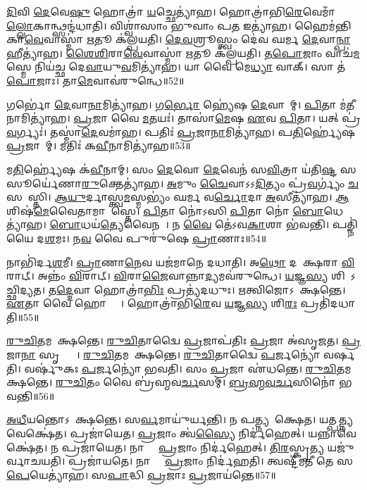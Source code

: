 \ul{𑌦𑌿}𑌵𑌿 \ul{𑌦𑍇}𑌵𑍇\ul{𑌷𑍁} 𑌹𑍋𑌤𑍍𑌰𑌾॑ \ul{𑌯}𑌚𑍍𑌛𑍇𑌤𑍍𑌯𑌾॑𑌹। 
𑌹𑍋𑌤𑍍𑌰𑌾॑𑌭𑌿\ul{𑌰𑍇}𑌵𑍇𑌮𑌾𑌁\ul{𑌲𑍍𑌲𑍋}𑌕𑌾𑌨𑍍𑌥𑍍𑌸𑌨𑍍𑌦॑\-𑌧𑌾𑌤𑌿। 
𑌵𑌿𑌶𑍍𑌵𑌾॑𑌸𑌾𑌂 𑌭𑍁𑌵𑌾𑌂 𑌪\ul{𑌤} 𑌇𑌤𑍍𑌯𑌾॑𑌹। 
𑌹𑍈𑌮॑𑌨𑍍𑌤𑌿𑌕𑌾\ul{𑌵𑍇}𑌵𑌾𑌸𑍍𑌮𑌾॑ \ul{𑌋}𑌤𑍂 𑌕॑𑌲𑍍𑌪𑌯𑌤𑌿। 
\ul{𑌦𑍇}\ul{𑌵}𑌶𑍍𑌰𑍂𑌸𑍍𑌤𑍍𑌵𑌂 𑌦𑍇॑𑌵 𑌘𑌰𑍍𑌮 \ul{𑌦𑍇}𑌵𑌾\ul{𑌨𑍍𑌪𑌾}𑌹𑍀𑌤𑍍𑌯𑌾॑𑌹। 
\ul{𑌶𑍈}\ul{𑌶𑌿}𑌰𑌾\ul{𑌵𑍇}𑌵𑌾𑌸𑍍𑌮𑌾॑ \ul{𑌋}𑌤𑍂 𑌕॑𑌲𑍍𑌪𑌯𑌤𑌿। 
\ul{𑌤}\ul{𑌪𑍋}𑌜𑌾𑌂 𑌵𑌾𑌚॑\ul{𑌮}𑌸𑍍𑌮𑍇 𑌨𑌿𑌯॑𑌚𑍍𑌛 𑌦𑍇\ul{𑌵𑌾}𑌯𑍁\ul{𑌵}𑌮𑌿𑌤𑍍𑌯𑌾॑𑌹। 
𑌯𑌾 𑌵𑍈 𑌮𑍇\ul{𑌧𑍍𑌯𑌾} 𑌵𑌾𑌕𑍍। 
𑌸𑌾 𑌤॑\ul{𑌪𑍋}𑌜𑌾𑌃। 
𑌤𑌾\ul{𑌮𑍇}𑌵𑌾𑌵॑𑌰𑍁𑌨𑍍𑌧𑍇॥52॥

𑌗𑌰𑍍𑌭𑍋॑ \ul{𑌦𑍇}𑌵𑌾\ul{𑌨𑌾}𑌮𑌿𑌤𑍍𑌯𑌾॑𑌹। 
𑌗\ul{𑌰𑍍𑌭𑍋} 𑌹𑍍𑌯𑍇॑𑌷 \ul{𑌦𑍇}𑌵𑌾𑌨𑌾᳚𑌮𑍍। 
\ul{𑌪𑌿}𑌤𑌾 𑌮॑\ul{𑌤𑍀}𑌨𑌾𑌮𑌿𑌤𑍍𑌯𑌾॑𑌹। 
\ul{𑌪𑍍𑌰}𑌜𑌾 𑌵𑍈 \ul{𑌮}𑌤𑌯𑌃॑। 
𑌤𑌾𑌸𑌾॑\ul{𑌮𑍇}𑌷 \ul{𑌏}𑌵 \ul{𑌪𑌿}𑌤𑌾। 
𑌯𑌤𑍍 𑌪𑍍𑌰॑\ul{𑌵}𑌰𑍍𑌗𑍍𑌯𑌃॑। 
𑌤𑌸𑍍𑌮𑌾॑\ul{𑌦𑍇}𑌵𑌮𑌾॑𑌹। 
𑌪𑌤𑌿𑌃॑ \ul{𑌪𑍍𑌰}𑌜𑌾\ul{𑌨𑌾}𑌮𑌿𑌤𑍍𑌯𑌾॑𑌹। 
𑌪\ul{𑌤𑌿}𑌰𑍍𑌹𑍍𑌯𑍇॑𑌷 \ul{𑌪𑍍𑌰}𑌜𑌾𑌨𑌾᳚𑌮𑍍। 
𑌮𑌤𑌿𑌃॑ 𑌕\ul{𑌵𑍀}𑌨𑌾𑌮𑌿𑌤𑍍𑌯𑌾॑𑌹॥53॥

𑌮\ul{𑌤𑌿}𑌰𑍍𑌹𑍍𑌯𑍇॑𑌷 𑌕॑\ul{𑌵𑍀}𑌨𑌾𑌮𑍍। 
𑌸𑌂 \ul{𑌦𑍇}𑌵𑍋 \ul{𑌦𑍇}𑌵𑍇𑌨॑ 𑌸\ul{𑌵𑌿}𑌤𑍍𑌰𑌾 𑌯॑𑌤𑌿\ul{𑌷𑍍𑌟} 𑌸 𑌸𑍂𑌰𑍍𑌯𑍇॑𑌣𑌾\ul{𑌰𑍁}𑌕𑍍𑌤𑍇𑌤𑍍𑌯𑌾॑𑌹। 
\ul{𑌅}𑌮𑍁𑌂 \ul{𑌚𑍈}𑌵𑌾𑌽𑌽\ul{𑌦𑌿}𑌤𑍍𑌯𑌂 𑌪𑍍𑌰॑\ul{𑌵}𑌰𑍍𑌗𑍍𑌯𑌂॑ \ul{𑌚} 𑌸𑌶𑌾᳚𑌸𑍍𑌤𑌿। 
\ul{𑌆}\ul{𑌯𑍁}𑌰𑍍𑌦𑌾𑌸𑍍𑌤𑍍𑌵\ul{𑌮}𑌸𑍍𑌮𑌭𑍍𑌯𑌂॑ 𑌘𑌰𑍍𑌮 𑌵\ul{𑌰𑍍𑌚𑍋}𑌦𑌾 \ul{𑌅}𑌸𑍀𑌤𑍍𑌯𑌾॑𑌹। 
\ul{𑌆}𑌶𑌿𑌷॑\ul{𑌮𑍇}𑌵𑍈𑌤𑌾𑌮𑌾𑌶𑌾᳚𑌸𑍍𑌤𑍇। 
\ul{𑌪𑌿}𑌤𑌾 𑌨𑍋॑𑌽𑌸𑌿 \ul{𑌪𑌿}𑌤𑌾 𑌨𑍋॑ \ul{𑌬𑍋}𑌧𑍇𑌤𑍍𑌯𑌾॑𑌹। 
\ul{𑌬𑍋}𑌧𑌯॑\ul{𑌤𑍍𑌯𑍇}𑌵𑍈𑌨𑌮𑍍᳚। 
𑌨 \ul{𑌵𑍈} 𑌤𑍇॑𑌽𑌵\ul{𑌕𑌾}𑌶𑌾 𑌭॑𑌵𑌨𑍍𑌤𑌿। 
𑌪𑌤𑍍𑌨𑌿॑𑌯𑍈 𑌦\ul{𑌶}𑌮𑌃। 
𑌨\ul{𑌵} 𑌵𑍈 𑌪𑍁𑌰𑍁॑𑌷𑍇 \ul{𑌪𑍍𑌰𑌾}𑌣𑌾𑌃॥54॥

𑌨𑌾𑌭𑌿॑𑌰𑍍𑌦\ul{𑌶}𑌮𑍀। 
\ul{𑌪𑍍𑌰𑌾}𑌣𑌾\ul{𑌨𑍇}𑌵 𑌯𑌜॑𑌮𑌾𑌨𑍇 𑌦𑌧𑌾𑌤𑌿। 
𑌅\ul{𑌥𑍋} 𑌦𑌶𑌾᳚𑌕𑍍𑌷𑌰𑌾 \ul{𑌵𑌿}𑌰𑌾𑌟𑍍। 
𑌅𑌨𑍍𑌨𑌂॑  \ul{𑌵𑌿}𑌰𑌾𑌟𑍍। 
\ul{𑌵𑌿}𑌰𑌾\ul{𑌜𑍈}𑌵𑌾𑌨𑍍𑌨𑌾\ul{𑌦𑍍𑌯}𑌮𑌵॑𑌰𑍁𑌨𑍍𑌧𑍇। 
\ul{𑌯}𑌜𑍍𑌞\ul{𑌸𑍍𑌯} 𑌶𑌿𑌰𑍋᳚𑌽𑌚𑍍𑌛𑌿𑌦𑍍𑌯𑌤। 
𑌤\ul{𑌦𑍍𑌦𑍇}𑌵𑌾 𑌹𑍋𑌤𑍍𑌰𑌾॑\ul{𑌭𑌿𑌃} 𑌪𑍍𑌰𑌤𑍍𑌯॑𑌦𑌧𑍁𑌃। 
\ul{𑌋}𑌤𑍍𑌵𑌿𑌜𑍋𑌽𑌵𑍇᳚𑌕𑍍𑌷𑌨𑍍𑌤𑍇। 
\ul{𑌏}𑌤𑌾 𑌵𑍈 𑌹𑍋𑌤𑍍𑌰𑌾𑌃᳚। 
𑌹𑍋𑌤𑍍𑌰𑌾॑𑌭𑌿\ul{𑌰𑍇}𑌵 \ul{𑌯}𑌜𑍍𑌞\ul{𑌸𑍍𑌯} 𑌶𑌿\ul{𑌰𑌃} 𑌪𑍍𑌰𑌤𑌿॑𑌦𑌧𑌾𑌤𑌿॥55॥

\ul{𑌰𑍁}\ul{𑌚𑌿}𑌤𑌮𑌵𑍇᳚𑌕𑍍𑌷𑌨𑍍𑌤𑍇। 
\ul{𑌰𑍁}\ul{𑌚𑌿}𑌤𑌾𑌦𑍍𑌵𑍈 \ul{𑌪𑍍𑌰}𑌜𑌾𑌪॑𑌤𑌿𑌃 \ul{𑌪𑍍𑌰}𑌜𑌾 𑌅॑𑌸𑍃𑌜𑌤। 
\ul{𑌪𑍍𑌰}𑌜𑌾\ul{𑌨𑌾}\ul{} 𑌸𑍃𑌷𑍍𑌟𑍍𑌯𑍈᳚। 
\ul{𑌰𑍁}\ul{𑌚𑌿}𑌤𑌮𑌵𑍇᳚𑌕𑍍𑌷𑌨𑍍𑌤𑍇। 
\ul{𑌰𑍁}\ul{𑌚𑌿}𑌤𑌾𑌦𑍍𑌵𑍈 \ul{𑌪}𑌰𑍍𑌜𑌨𑍍𑌯𑍋॑ 𑌵𑌰𑍍\mbox{}𑌷𑌤𑌿। 
𑌵𑌰𑍍\mbox{}𑌷𑍁॑𑌕𑌃 \ul{𑌪}𑌰𑍍𑌜𑌨𑍍𑌯𑍋॑ 𑌭𑌵𑌤𑌿। 
𑌸𑌂 \ul{𑌪𑍍𑌰}𑌜𑌾 𑌏॑𑌧𑌨𑍍𑌤𑍇। 
\ul{𑌰𑍁}\ul{𑌚𑌿}𑌤𑌮𑌵𑍇᳚𑌕𑍍𑌷𑌨𑍍𑌤𑍇। 
\ul{𑌰𑍁}\ul{𑌚𑌿}𑌤𑌂 𑌵𑍈 𑌬𑍍𑌰॑𑌹𑍍𑌮𑌵\ul{𑌰𑍍𑌚}𑌸𑌮𑍍। 
\ul{𑌬𑍍𑌰}\ul{𑌹𑍍𑌮}\ul{𑌵}\ul{𑌰𑍍𑌚}𑌸𑌿𑌨𑍋॑ 𑌭𑌵𑌨𑍍𑌤𑌿॥56॥

\ul{𑌅}\ul{𑌧𑍀}𑌯𑌨𑍍𑌤𑍋𑌽𑌵𑍇᳚𑌕𑍍𑌷𑌨𑍍𑌤𑍇। 
𑌸\ul{𑌰𑍍𑌵}𑌮𑌾𑌯𑍁॑𑌰𑍍\mbox{}𑌯𑌨𑍍𑌤𑌿। 
𑌨 𑌪𑌤𑍍𑌨𑍍𑌯𑌵𑍇᳚𑌕𑍍𑌷𑍇𑌤। 
𑌯𑌤𑍍𑌪\ul{𑌤𑍍𑌨𑍍𑌯}𑌵𑍇𑌕𑍍𑌷𑍇॑𑌤। 
𑌪𑍍𑌰𑌜𑌾॑𑌯𑍇𑌤। 
\ul{𑌪𑍍𑌰}𑌜𑌾𑌂 𑌤𑍍𑌵॑\ul{𑌸𑍍𑌯𑍈} 𑌨𑌿𑌰𑍍𑌦॑𑌹𑍇𑌤𑍍। 
𑌯𑌨𑍍𑌨𑌾𑌵𑍇𑌕𑍍𑌷𑍇॑𑌤। 
𑌨 𑌪𑍍𑌰𑌜𑌾॑𑌯𑍇𑌤। 
𑌨𑌾𑌸𑍍𑌯𑍈᳚ \ul{𑌪𑍍𑌰}𑌜𑌾𑌂 𑌨𑌿𑌰𑍍𑌦॑𑌹𑍇𑌤𑍍। 
\ul{𑌤𑌿}\ul{𑌰}𑌸𑍍𑌕𑍃\ul{𑌤𑍍𑌯} 𑌯𑌜𑍁॑𑌰𑍍𑌵𑌾𑌚𑌯𑌤𑌿। 
𑌪𑍍𑌰𑌜𑌾॑𑌯𑌤𑍇। 
𑌨𑌾𑌸𑍍𑌯𑍈᳚ \ul{𑌪𑍍𑌰}𑌜𑌾𑌂 𑌨𑌿𑌰𑍍𑌦॑𑌹𑌤𑌿। 
𑌤𑍍𑌵𑌷𑍍𑌟𑍀॑𑌮𑌤𑍀 𑌤𑍇 𑌸\ul{𑌪𑍇}𑌯𑍇𑌤𑍍𑌯𑌾॑𑌹। 
𑌸\ul{𑌪𑌾}𑌦𑍍𑌧𑌿 \ul{𑌪𑍍𑌰}𑌜𑌾𑌃 \ul{𑌪𑍍𑌰}𑌜𑌾𑌯॑𑌨𑍍𑌤𑍇॥57॥

